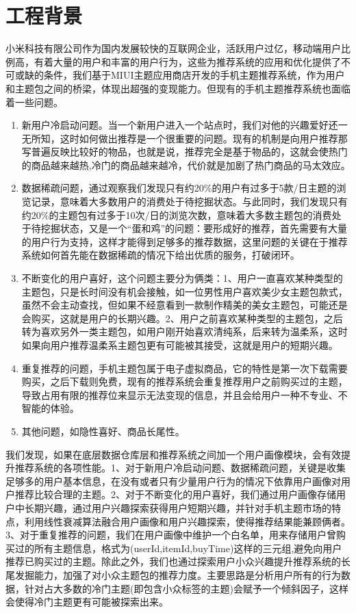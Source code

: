 \section{工程背景}
	小米科技有限公司作为国内发展较快的互联网企业，活跃用户过亿，移动端用户比例高，有着大量的用户和丰富的用户行为，这些为推荐系统的应用和优化提供了不可或缺的条件，我们基于MIUI主题应用商店开发的手机主题推荐系统，作为用户和主题包之间的桥梁，体现出超强的变现能力。但现有的手机主题推荐系统也面临着一些问题。
	\begin{enumerate}[(1)]
	\item 新用户冷启动问题。当一个新用户进入一个站点时，我们对他的兴趣爱好还一无所知，这时如何做出推荐是一个很重要的问题。现有的机制是向用户推荐那写普遍反映比较好的物品，也就是说，推荐完全是基于物品的，这就会使热门的商品越来越热,冷门的商品越来越冷，代价就是加剧了热门商品的马太效应。

	\item 数据稀疏问题，通过观察我们发现只有约20\%的用户有过多于5款/日主题的浏览记录，意味着大多数用户的消费处于待挖掘状态。与此同时，我们发现只有约20\%的主题包有过多于10次/日的浏览次数，意味着大多数主题包的消费处于待挖掘状态，又是一个“蛋和鸡”的问题：要形成好的推荐，首先需要有大量的用户行为支持，这样才能得到足够多的推荐数据，这里问题的关键在于推荐系统如何首先能在数据稀疏的情况下给出优质的服务，打破闭环。

	\item 不断变化的用户喜好，这个问题主要分为俩类：1、用户一直喜欢某种类型的主题包，只是长时间没有机会接触，如一位男性用户喜欢美少女主题包款式，虽然不会主动查找，但如果不经意看到一款制作精美的美女主题包，可能还是会购买，这就是用户的长期兴趣。2、用户之前喜欢某种类型的主题包，之后转为喜欢另外一类主题包，如用户刚开始喜欢清纯系，后来转为温柔系，这时如果向用户推荐温柔系主题包更有可能被其接受，这就是用户的短期兴趣。

	\item 重复推荐的问题，手机主题包属于电子虚拟商品，它的特性是第一次下载需要购买，之后下载则免费，现有的推荐系统会重复推荐用户之前购买过的主题，导致占用有限的推荐位来显示无法变现的信息，并且会给用户一种不专业、不智能的体验。

	\item 其他问题，如隐性喜好\citep{latent-cf}、商品长尾性\citep{long-tail}。
	\end{enumerate}

	我们发现，如果在底层数据仓库层和推荐系统之间加一个用户画像模块，会有效提升推荐系统的各项性能。1、对于新用户冷启动问题、数据稀疏问题，关键是收集足够多的用户基本信息，在没有或者只有少量用户行为的情况下依靠用户画像对用户推荐比较合理的主题。2、对于不断变化的用户喜好，我们通过用户画像存储用户中长期兴趣，通过用户兴趣探索获得用户短期兴趣，并针对手机主题市场的特点，利用线性衰减算法融合用户画像和用户兴趣探索，使得推荐结果能兼顾俩者。3、对于重复推荐的问题，我们在用户画像中维护一个白名单，用来存储用户曾购买过的所有主题信息，格式为(userId,itemId,buyTime)这样的三元组,避免向用户推荐已购买过的主题。除此之外，我们也通过探索用户小众兴趣提升推荐系统的长尾发掘能力，加强了对小众主题包的推荐力度。主要思路是分析用户所有的行为数据，针对占大多数的冷门主题(即包含小众标签的主题)会赋予一个倾斜因子，这样会使得冷门主题更有可能被探索出来。


